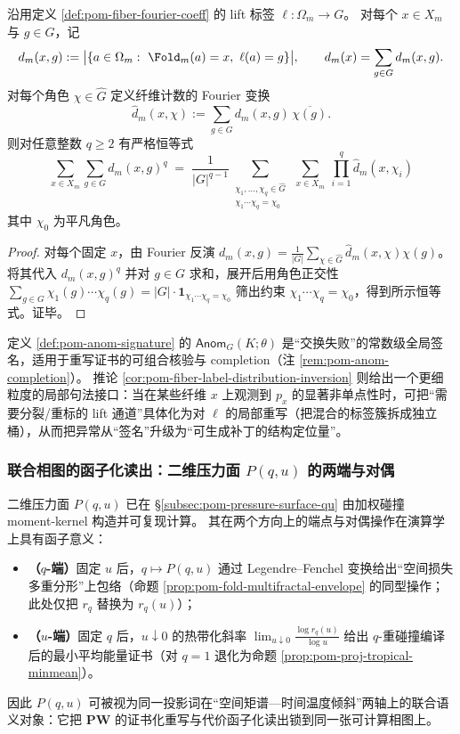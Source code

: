 \begin{proposition}\label{prop:pom-mom-lift-fourier-distribution}
沿用定义 \ref{def:pom-fiber-fourier-coeff} 的 lift 标签 \(\ell:\Omega_m\to G\)。
对每个 \(x\in X_m\) 与 \(g\in G\)，记
\[
d_m(x,g):=\bigl|\{a\in\Omega_m:\ \Fold_m(a)=x,\ \ell(a)=g\}\bigr|,
\qquad
d_m(x)=\sum_{g\in G}d_m(x,g).
\]
对每个角色 \(\chi\in\widehat G\) 定义纤维计数的 Fourier 变换
\[
\widehat d_m(x,\chi):=\sum_{g\in G} d_m(x,g)\,\overline{\chi(g)}.
\]
则对任意整数 \(q\ge 2\) 有严格恒等式
\[
\boxed{\;
\sum_{x\in X_m}\sum_{g\in G} d_m(x,g)^q
\;=\;
\frac{1}{|G|^{q-1}}
\sum_{\substack{\chi_1,\dots,\chi_q\in\widehat G\\ \chi_1\cdots\chi_q=\chi_0}}
\ \sum_{x\in X_m}\ \prod_{i=1}^q \widehat d_m(x,\chi_i)\;}
\]
其中 \(\chi_0\) 为平凡角色。
\end{proposition}
\begin{proof}
对每个固定 \(x\)，由 Fourier 反演
\(
d_m(x,g)=\frac{1}{|G|}\sum_{\chi\in\widehat G}\widehat d_m(x,\chi)\chi(g)
\)。
将其代入 \(d_m(x,g)^q\) 并对 \(g\in G\) 求和，展开后用角色正交性
\(
\sum_{g\in G}\chi_1(g)\cdots\chi_q(g)
=|G|\cdot \mathbf{1}_{\chi_1\cdots\chi_q=\chi_0}
\)
筛出约束 \(\chi_1\cdots\chi_q=\chi_0\)，得到所示恒等式。证毕。
\end{proof}

\begin{remark}[从全局签名到局部调试补丁]\label{rem:pom-anom-localization-bridge}
定义 \ref{def:pom-anom-signature} 的 \(\mathsf{Anom}_G(K;\theta)\) 是“交换失败”的常数级全局签名，适用于重写证书的可组合核验与 completion（注 \ref{rem:pom-anom-completion}）。
推论 \ref{cor:pom-fiber-label-distribution-inversion} 则给出一个更细粒度的局部句法接口：当在某些纤维 \(x\) 上观测到 \(p_x\) 的显著非单点性时，可把“需要分裂/重标的 lift 通道”具体化为对 \(\ell\) 的局部重写（把混合的标签簇拆成独立桶），从而把异常从“签名”升级为“可生成补丁的结构定位量”。
\end{remark}

\subsubsection{联合相图的函子化读出：二维压力面 \texorpdfstring{$P(q,u)$}{P(q,u)} 的两端与对偶}\label{subsec:pom-joint-phase-functor}
二维压力面 \(P(q,u)\) 已在 \S\ref{subsec:pom-pressure-surface-qu} 由加权碰撞 moment-kernel 构造并可复现计算。
其在两个方向上的端点与对偶操作在演算学上具有函子意义：
\begin{itemize}
  \item \textbf{（\(q\)-端）}固定 \(u\) 后，\(q\mapsto P(q,u)\) 通过 Legendre--Fenchel 变换给出“空间损失多重分形”上包络（命题 \ref{prop:pom-fold-multifractal-envelope} 的同型操作；此处仅把 \(r_q\) 替换为 \(r_q(u)\)）；
  \item \textbf{（\(u\)-端）}固定 \(q\) 后，\(u\downarrow 0\) 的热带化斜率
  \(
  \lim_{u\downarrow 0}\frac{\log r_q(u)}{\log u}
  \)
  给出 \(q\)-重碰撞编译后的最小平均能量证书（对 \(q=1\) 退化为命题 \ref{prop:pom-proj-tropical-minmean}）。
\end{itemize}
因此 \(P(q,u)\) 可被视为同一投影词在“空间矩谱—时间温度倾斜”两轴上的联合语义对象：它把 \(\mathbf{PW}\) 的证书化重写与代价函子化读出锁到同一张可计算相图上。
